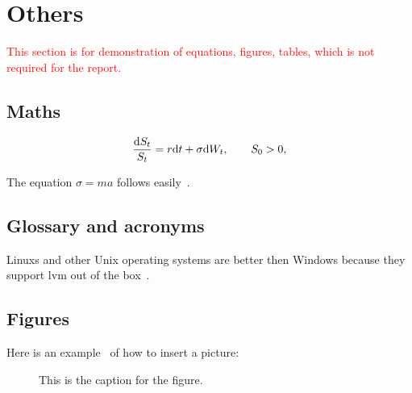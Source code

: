 \section{Others}
\textcolor{red}{This section is for demonstration of equations, figures, tables, which is not required for the report.}
\subsection{Maths}
\begin{equation}\label{eq:BS}
\frac{\mathrm{d} S_t}{S_t} = r \mathrm{d} t + \sigma \mathrm{d} W_t,
\qquad S_0>0,
\end{equation}

The equation $\sigma = m a$ follows easily~\cite{Doe11}.


\subsection{Glossary and acronyms}

\Glspl{Linux} and other Unix operating systems are better then Windows because they support \gls{lvm} out of the box~\cite{Joh11}. 

\subsection{Figures}
Here is an example~\cite{JohSil05} of how to insert a picture:

\begin{figure}[!ht]
\centering
{}
\caption{This is the caption for the figure.}
\label{fig:Pict}
\end{figure}


